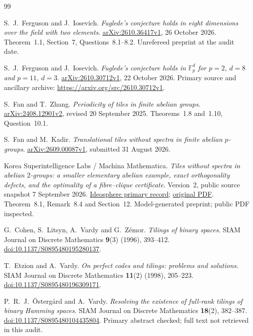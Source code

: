 \documentclass[11pt]{article}
\theoremstyle{definition}\newtheorem{definition}[theorem]{Definition}
\theoremstyle{remark}\newtheorem{remark}[theorem]{Remark}
\newcommand{\F}{\mathbb F}
\begin{document}
\begin{thebibliography}{99}

 S.~J.~Ferguson and J.~Iosevich.
\emph{Fuglede's conjecture holds in eight dimensions over the field with two elements}.
\href{https://arxiv.org/html/2610.36417v1}{arXiv:2610.36417v1}, 26 October 2026.
Theorem~1.1, Section~7, Questions~8.1--8.2. Unrefereed preprint at the audit date.

 S.~J.~Ferguson and J.~Iosevich.
\emph{Fuglede's conjecture holds in $\F_p^d$ for $p=2$, $d=8$ and $p=11$, $d=3$}.
\href{https://arxiv.org/html/2610.30712v1}{arXiv:2610.30712v1}, 22 October 2026.
Primary source and ancillary archive: \url{https://arxiv.org/src/2610.30712v1}.

 S.~Fan and T.~Zhang.
\emph{Periodicity of tiles in finite abelian groups}.
\href{https://arxiv.org/html/2408.12901v2}{arXiv:2408.12901v2}, revised 20 September 2025.
Theorems~1.8 and~1.10, Question~10.1.

 S.~Fan and M.~Kadir.
\emph{Translational tiles without spectra in finite abelian $p$-groups}.
\href{https://arxiv.org/abs/2609.00087}{arXiv:2609.00087v1}, submitted 31 August 2026.

 Korea Superintelligence Labs / Machina Mathematica.
\emph{Tiles without spectra in abelian $2$-groups: a smaller elementary abelian example, exact orthogonality defects, and the optimality of a fibre--clique certificate}.
Version~2, public source snapshot 7 September 2026.
\href{https://ideosphere.ai/papers/fuglede-pgroup}{Ideosphere primary record};
\href{https://lean.up.railway.app/papers/fuglede-pgroup-v2.pdf}{original PDF}.
Theorem~8.1, Remark~8.4 and Section~12. Model-generated preprint; public PDF inspected.

 G.~Cohen, S.~Litsyn, A.~Vardy and G.~Z\'emor.
\emph{Tilings of binary spaces}.
SIAM Journal on Discrete Mathematics \textbf{9}(3) (1996), 393--412.
\href{https://doi.org/10.1137/S0895480195280137}{doi:10.1137/S0895480195280137}.

 T.~Etzion and A.~Vardy.
\emph{On perfect codes and tilings: problems and solutions}.
SIAM Journal on Discrete Mathematics \textbf{11}(2) (1998), 205--223.
\href{https://doi.org/10.1137/S0895480196309171}{doi:10.1137/S0895480196309171}.

 P.~R.~J.~\"Osterg\aa rd and A.~Vardy.
\emph{Resolving the existence of full-rank tilings of binary Hamming spaces}.
SIAM Journal on Discrete Mathematics \textbf{18}(2), 382--387.
\href{https://doi.org/10.1137/S0895480104435804}{doi:10.1137/S0895480104435804}.
Primary abstract checked; full text not retrieved in this audit.


\end{thebibliography}
\end{document}
